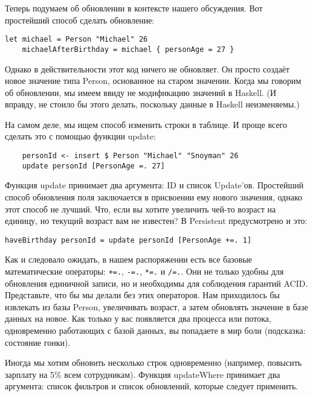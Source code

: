 Теперь подумаем об обновлении в контексте нашего обсуждения. Вот простейший способ сделать обновление:

\begin{lstlisting}
let michael = Person "Michael" 26
    michaelAfterBirthday = michael { personAge = 27 }
\end{lstlisting}

Однако в действительности этот код ничего не обновляет. Он просто создаёт новое значение типа Person, основанное на старом значении. Когда мы говорим об обновлении, мы имеем ввиду не модификацию значений в Haskell. (И вправду, не стоило бы этого делать, поскольку данные в Haskell неизменяемы.) %

На самом деле, мы ищем способ изменить строки в таблице. И проще всего сделать это с помощью функции update:

\begin{lstlisting}
    personId <- insert $ Person "Michael" "Snoyman" 26
    update personId [PersonAge =. 27]
\end{lstlisting}%

Функция update принимает два аргумента: ID и список Update'ов. Простейший способ обновления поля заключается в присвоении ему нового значения, однако этот способ не лучший. Что, если вы хотите увеличить чей-то возраст на единицу, но текущий возраст вам не известен? В Persistent предусмотрено и это:

\begin{lstlisting}
haveBirthday personId = update personId [PersonAge +=. 1]
\end{lstlisting}%

Как и следовало ожидать, в нашем распоряжении есть все базовые математические операторы: \lstinline'+=.', \lstinline'-=.', \lstinline'*=.' и \lstinline'/=.'. Они не только удобны для обновления единичной записи, но и необходимы для соблюдения гарантий ACID. Представьте, что бы мы делали без этих операторов. Нам приходилось бы извлекать из базы Person, увеличивать возраст, а затем обновлять значение в базе данных на новое. Как только у вас появляется два процесса или потока, одновременно работающих с базой данных, вы попадаете в мир боли (подсказка: состояние гонки).

Иногда мы хотим обновить несколько строк одновременно (например, повысить зарплату на 5\% всем сотрудникам). Функция updateWhere принимает два аргумента: список фильтров и список обновлений, которые следует применить. %

